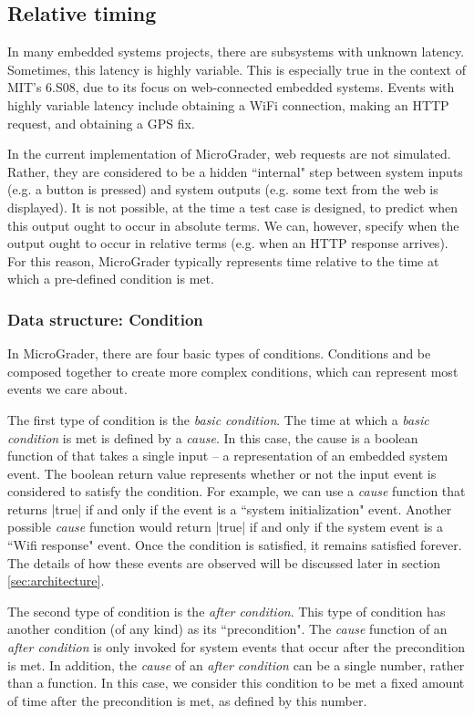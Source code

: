 \documentclass[12pt]{article}
\begin{document}
\subsection{Relative timing}
In many embedded systems projects, there are subsystems with unknown latency.  Sometimes, this latency is highly variable.  This is especially true in the context of MIT's 6.S08, due to its focus on web-connected embedded systems.  Events with highly variable latency include obtaining a WiFi connection, making an HTTP request, and obtaining a GPS fix.

In the current implementation of MicroGrader, web requests are not simulated.  Rather, they are considered to be a hidden ``internal" step between system inputs (e.g. a button is pressed) and system outputs (e.g. some text from the web is displayed).  It is not possible, at the time a test case is designed, to predict when this output ought to occur in absolute terms.  We can, however, specify when the output ought to occur in relative terms (e.g. when an HTTP response arrives).  For this reason, MicroGrader typically represents time relative to the time at which a pre-defined condition is met.

\subsubsection{Data structure: Condition}
\label{sec:condition}
In MicroGrader, there are four basic types of conditions.  Conditions and be composed together to create more complex conditions, which can represent most events we care about.

The first type of condition is the \textit{basic condition}.  The time at which a \textit{basic condition} is met is defined by a \textit{cause}.  In this case, the cause is a boolean function of that takes a single input -- a representation of an embedded system event.  The boolean return value represents whether or not the input event is considered to satisfy the condition.  For example, we can use a \textit{cause} function that returns |true| if and only if the event is a ``system initialization" event.  Another possible \textit{cause} function would return |true| if and only if the system event is a ``Wifi response" event.  Once the condition is satisfied, it remains satisfied forever.  The details of how these events are observed will be discussed later in section \ref{sec:architecture}. 

The second type of condition is the \textit{after condition}.  This type of condition has another condition (of any kind) as its ``precondition".  The \textit{cause} function of an \textit{after condition} is only invoked for system events that occur after the precondition is met.   In addition, the \textit{cause} of an \textit{after condition} can be a single number, rather than a function.  In this case, we consider this condition to be met a fixed amount of time after the precondition is met, as defined by this number.
\end{document}
